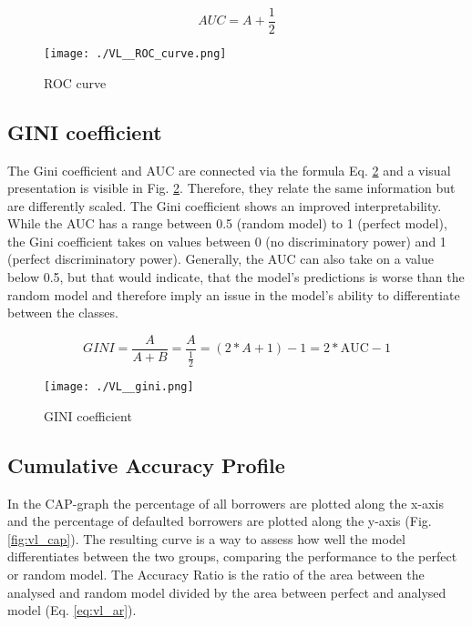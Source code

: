 \begin{equation}
AUC = A + \frac{1}{2} \label{eq:vl_auc}
\end{equation}

\begin{figure}[H]
	\centering
	\texttt{[image: ./VL\_\_ROC\_curve.png]}
    \caption{ROC curve}
    \label{fig:vl_roccurve}
\end{figure}

\subsection{GINI coefficient}
\label{sec:gini}
The Gini coefficient and AUC are connected via the formula Eq. \ref{fig:vl_gini} and a visual presentation is visible in Fig. \ref{fig:vl_gini}. Therefore, they relate the same information but are differently scaled. The Gini coefficient shows an improved interpretability. While the AUC has a range between 0.5 (random model) to 1 (perfect model), the Gini coefficient takes on values between 0 (no discriminatory power) and 1 (perfect discriminatory power). Generally, the AUC can also take on a value below 0.5, but that would indicate, that the model's predictions is worse than the random model and therefore imply an issue in the model's ability to differentiate between the classes. 

\begin{equation}
GINI = \frac{A}{A + B} = \frac{A}{\frac{1}{2}} = (2 * A + 1) - 1 = 2 * \text{AUC} - 1 \label{eq:vl_gini}
\end{equation}

\begin{figure}[H]
	\centering
	\texttt{[image: ./VL\_\_gini.png]}
    \caption{GINI coefficient}
    \label{fig:vl_gini}
\end{figure}

\subsection{Cumulative Accuracy Profile}

In the CAP-graph the percentage of all borrowers are plotted along the x-axis and the percentage of defaulted borrowers are plotted along the y-axis (Fig. \ref{fig:vl_cap}). The resulting curve is a way to assess how well the model differentiates between the two groups, comparing the performance to the perfect or random model. The Accuracy Ratio is the ratio of the area between the analysed and random model divided by the area between perfect and analysed model (Eq. \ref{eq:vl_ar}). 

